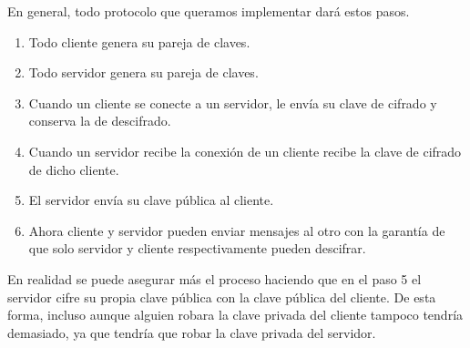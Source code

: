 \documentclass[a4paper,12pt,spanish]{sphinxmanual}
\begin{document}
En general, todo protocolo que queramos implementar dará estos pasos.
\begin{enumerate}
\item {} 
Todo cliente genera su pareja de claves.

\item {} 
Todo servidor genera su pareja de claves.

\item {} 
Cuando un cliente se conecte a un servidor, le envía su clave de cifrado y conserva la de descifrado.

\item {} 
Cuando un servidor recibe la conexión de un cliente recibe la clave de cifrado de dicho cliente.

\item {} 
El servidor envía su clave pública al cliente.

\item {} 
Ahora cliente y servidor pueden enviar mensajes al otro con la garantía de que solo servidor y cliente respectivamente pueden descifrar.

\end{enumerate}

En realidad se puede asegurar más el proceso haciendo que en el paso 5 el servidor cifre su propia clave pública con la clave pública del cliente. De esta forma, incluso aunque alguien robara la clave privada del cliente tampoco tendría demasiado, ya que tendría que robar la clave privada del servidor.
\end{document}
